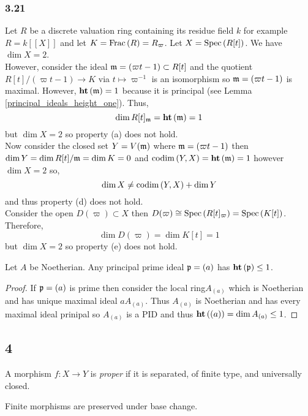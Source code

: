\documentclass[12pt]{article}
\begin{document}
\subsubsection{3.21}

Let $R$ be a discrete valuation ring containing its residue field $k$ for example $R = k[[X]]$ and let $K = \mathrm{Frac}\left(R\right) = R_\varpi$. Let $X = \mathrm{Spec}\left( R[t] \right)$. We have $\dim{X} = 2$. 
\bigskip\\
However, consider the ideal $\mathfrak{m} = (\varpi t - 1) \subset R[t]$ and the quotient $R[t]/(\varpi t - 1) \to K$ via $t \mapsto \varpi^{-1}$ is an isomorphism so $\mathfrak{m} = (\varpi t - 1)$ is maximal. However, $\mathbf{ht}\left( \mathfrak{m} \right) = 1$ because it is principal (see Lemma \ref{principal_ideals_height_one}). Thus,
\[ \dim{R[t]_{\mathfrak{m}}} = \mathbf{ht}\left( \mathfrak{m} \right) = 1 \]
but $\dim{X} = 2$ so property (a) does not hold.
\bigskip\\
Now consider the closed set $Y = V(\mathfrak{m})$ where $\mathfrak{m} = (\varpi t - 1)$ then $\dim{Y} = \dim{R[t] / \mathfrak{m}} = \dim{K} = 0$ and $\mathrm{codim}\left( Y, X \right) = \mathbf{ht}\left( \mathfrak{m} \right) = 1$ however $\dim{X} = 2$ so,
\[ \dim{X} \neq \mathrm{codim}\left( Y, X \right) + \dim{Y} \]
and thus property (d) does not hold. 
\bigskip\\
Consider the open $D(\varpi) \subset X$ then $D(\varpi) \cong \mathrm{Spec}\left( R[t]_\varpi \right) = \mathrm{Spec}\left( K[t] \right)$. Therefore,
\[ \dim{D(\varpi)} = \dim{K[t]} = 1 \]
but $\dim{X} = 2$ so property (e) does not hold.

\begin{lemma} \label{principal_ideals_height_one}
Let $A$ be Noetherian. Any principal prime ideal $\mathfrak{p} = (a)$ has $\mathbf{ht}\left( \mathfrak{p} \right) \le 1$.
\end{lemma}

\begin{proof}
If $\mathfrak{p} = (a)$ is prime then consider the local ring$A_{(a)}$ which is Noetherian and has unique maximal ideal $a A_{(a)}$. Thus $A_{(a)}$ is Noetherian and has every maximal ideal prinipal so $A_{(a)}$ is a PID and thus $\mathbf{ht}\left( (a) \right) = \dim{A_{(a)}} \le 1$.  
\end{proof}

\subsection{4}

\begin{definition}
A morphism $f : X \to Y$ is \textit{proper} if it is separated, of finite type, and universally closed. 
\end{definition}

\begin{lemma}
Finite morphisms are preserved under base change. 
\end{lemma}
\end{document}
